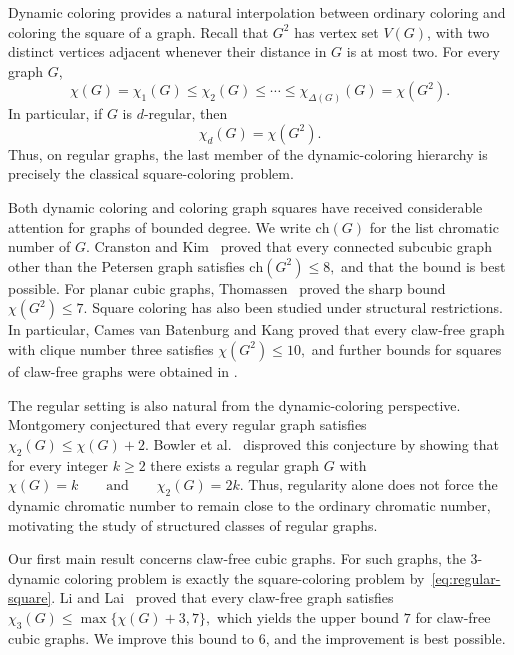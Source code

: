 \documentclass[a4paper,11pt]{article}
\theoremstyle{case}
\numberwithin{subcase}{case}
\begin{document}
Dynamic coloring provides a natural interpolation between ordinary
coloring and coloring the square of a graph. Recall that $G^2$ has
vertex set $V(G)$, with two distinct vertices adjacent whenever their
distance in $G$ is at most two. For every graph $G$,
\begin{equation}\label{eq:absolute-bounds}
\chi(G)=\chi_1(G)
\le \chi_2(G)
\le\cdots\le
\chi_{\Delta(G)}(G)
=\chi(G^2).
\end{equation}
In particular, if $G$ is $d$-regular, then
\begin{equation}\label{eq:regular-square}
\chi_d(G)=\chi(G^2).
\end{equation}
Thus, on regular graphs, the last member of the dynamic-coloring
hierarchy is precisely the classical square-coloring problem.

Both dynamic coloring and coloring graph squares have received
considerable attention for graphs of bounded degree. We write
$\text{ch}(G)$ for the list chromatic number of $G$.
Cranston and Kim~\cite{CranstonKim2008} proved that every connected
subcubic graph other than the Petersen graph satisfies
$
\text{ch}(G^2)\le8,
$
and that the bound is best possible. For planar cubic graphs,
Thomassen~\cite{Thomassen2018} proved the sharp bound
$
\chi(G^2)\le7.
$
Square coloring has also been studied under structural restrictions.
In particular, Cames van Batenburg and Kang
\cite{CamesVanBatenburgKang2019} proved that every claw-free graph
with clique number three satisfies
$
\chi(G^2)\le10,
$
and further bounds for squares of claw-free graphs were obtained in
\cite{DeJoannisKangPastor2019}.

The regular setting is also natural from the dynamic-coloring
perspective. Montgomery conjectured that every regular graph satisfies
$
\chi_2(G)\le\chi(G)+2.
$
Bowler et al.~\cite{BowlerEtAl2017} disproved this conjecture by showing
that for every integer $k\ge2$ there exists a regular graph $G$ with
$
\chi(G)=k
\qquad\text{and}\qquad
\chi_2(G)=2k.
$
Thus, regularity alone does not force the dynamic chromatic number to
remain close to the ordinary chromatic number, motivating the study of
structured classes of regular graphs.

Our first main result concerns claw-free cubic graphs. For such graphs,
the $3$-dynamic coloring problem is exactly the square-coloring problem
by~\eqref{eq:regular-square}. Li and Lai~\cite{LiLai2017} proved that
every claw-free graph satisfies
$
\chi_3(G)\le \max\{\chi(G)+3,7\},
$
which yields the upper bound $7$ for claw-free cubic graphs. We improve
this bound to $6$, and the improvement is best possible.
\end{document}
